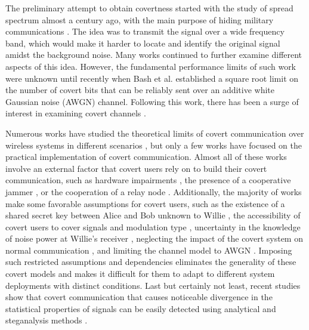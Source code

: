 The preliminary attempt to obtain covertness started with the study of spread spectrum almost a century ago, with the main purpose of hiding military communications \cite{scholtz1982origins}. The idea was to transmit the signal over a wide frequency band, which would make it harder to locate and identify the original signal amidst the background noise. Many works continued to further examine different aspects of this idea. However, the fundamental performance limits of such work were unknown until recently when Bash et al. \cite{bash2012square} established a square root limit on the number of covert bits that can be reliably sent over an additive white Gaussian noise (AWGN) channel. Following this work, there has been a surge of interest in examining covert channels \cite{sobers2017covert,soltani2018covert,sheikholeslami2018multi,cao2018wireless}.

Numerous works have studied the theoretical limits of covert communication over wireless systems in different scenarios \cite{bash2012square, soltani2018covert, sheikholeslami2018multi, li2021fundamental}, but only a few works have focused on the practical implementation of covert communication. Almost all of these works involve an external factor that covert users rely on to build their covert communication, such as hardware impairments \cite{mohammed2021adversarial}, the presence of a cooperative jammer \cite{sobers2017covert}, or the cooperation of a relay node \cite{liao2020generative, kim2022covert}. Additionally, the majority of works make some favorable assumptions for covert users, such as the existence of a shared secret key between Alice and Bob unknown to Willie \cite{soltani2018covert}, the accessibility of covert users to cover signals and modulation type \cite{grzesiak2021wireless}, uncertainty in the knowledge of noise power at Willie's receiver \cite{he2017covert}, neglecting the impact of the covert system on normal communication \cite{mohammed2021adversarial}, and limiting the channel model to AWGN \cite{mohammed2021adversarial}. Imposing such restricted assumptions and dependencies eliminates the generality of these covert models and makes it difficult for them to adapt to different system deployments with distinct conditions. Last but certainly not least, recent studies show that covert communication that causes noticeable divergence in the statistical properties of signals can be easily detected using analytical and steganalysis methods \cite{bahramali2021robust,huang2020exploiting}.

